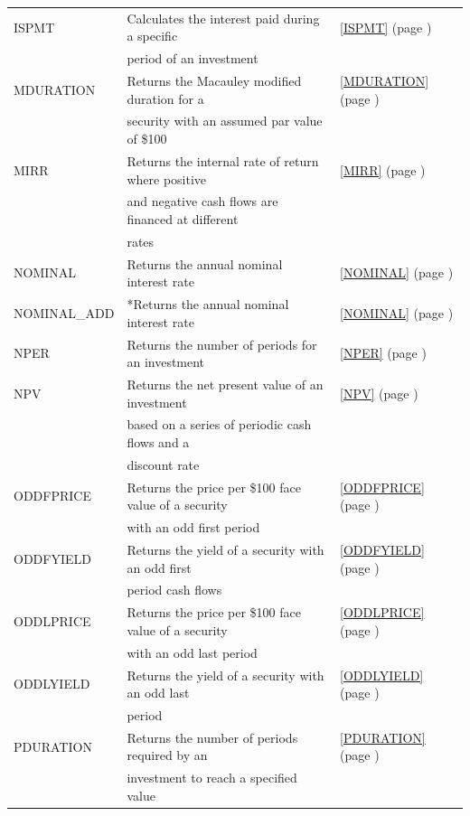 \begin{center}
\begin{longtable}{l l l }
		ISPMT & Calculates the interest paid during a specific &  \ref{ISPMT} (page \pageref{ISPMT}) \index{Spreadsheet Functions!ISPMT} \\
		& period of an investment &   \\
		MDURATION & Returns the Macauley modified duration for a &  \ref{MDURATION} (page \pageref{MDURATION}) \index{Spreadsheet Functions!MDURATION} \\
		& security with an assumed par value of \$100 &   \\
		MIRR  & Returns the internal rate of return where positive  &  \ref{MIRR} (page \pageref{MIRR}) \index{Spreadsheet Functions!MIRR} \\
		& and negative cash flows are financed at different  &   \\
		& rates &   \\
		NOMINAL & Returns the annual nominal interest rate &  \ref{NOMINAL} (page \pageref{NOMINAL}) \index{Spreadsheet Functions!NOMINAL} \\
		NOMINAL\_ADD & *Returns the annual nominal interest rate &  \ref{NOMINAL} (page \pageref{NOMINAL}) \index{Spreadsheet Functions!NOMINAL\_ADD} \\
		NPER  & Returns the number of periods for an investment &  \ref{NPER} (page \pageref{NPER}) \index{Spreadsheet Functions!NPER} \\
		NPV   & Returns the net present value of an investment  &  \ref{NPV} (page \pageref{NPV}) \index{Spreadsheet Functions!NPV} \\
		& based on a series of periodic cash flows and a &   \\
		& discount rate  &   \\
		ODDFPRICE & Returns the price per \$100 face value of a security &  \ref{ODDFPRICE} (page \pageref{ODDFPRICE}) \index{Spreadsheet Functions!ODDFPRICE} \\
		& with an odd first period &   \\
		ODDFYIELD & Returns the yield of a security with an odd first  &  \ref{ODDFYIELD} (page \pageref{ODDFYIELD}) \index{Spreadsheet Functions!ODDFYIELD} \\
		& period cash flows &   \\
		ODDLPRICE & Returns the price per \$100 face value of a security &  \ref{ODDLPRICE} (page \pageref{ODDLPRICE}) \index{Spreadsheet Functions!ODDLPRICE} \\
		& with an odd last period &   \\
		ODDLYIELD & Returns the yield of a security with an odd last  &  \ref{ODDLYIELD} (page \pageref{ODDLYIELD}) \index{Spreadsheet Functions!ODDLYIELD} \\
		& period &   \\
		PDURATION  & Returns the number of periods required by an  &  \ref{PDURATION} (page \pageref{PDURATION}) \index{Spreadsheet Functions!PDURATION} \\
		& investment to reach a specified value &   \\
		

\end{longtable}
\end{center}
